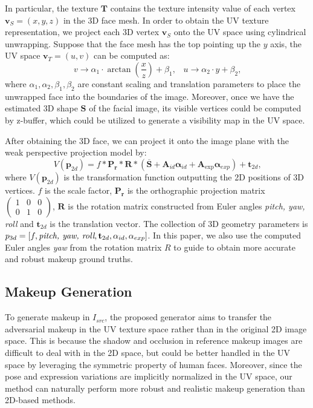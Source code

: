 \documentclass[10pt,journal,compsoc]{IEEEtran}
\begin{document}
In particular, the texture $\mathbf{T}$ contains the texture intensity value of each vertex $\mathbf{v}_S = (x, y, z)$ in the 3D face mesh. 
In order to obtain the UV texture representation, we project each 3D vertex $\mathbf{v}_S$ onto the UV space using cylindrical unwrapping. 
Suppose that the face mesh has the top pointing up the $y$ axis, the UV space $\mathbf{v}_T = (u, v)$ can be computed as:
\begin{equation}
	v \rightarrow \alpha_{1} \cdot \arctan \left(\frac{x}{z}\right)+\beta_{1}\text{,} \quad u \rightarrow \alpha_{2} \cdot y+\beta_{2} \text{,}
\end{equation}
where $\alpha_{1}, \alpha_{2}, \beta_{1}, \beta_{2}$ are constant scaling and translation parameters to place the unwrapped face into the boundaries of the image. 
Moreover, once we have the estimated 3D shape $\mathbf{S}$ of the facial image, its visible vertices could be computed by z-buffer, which could be utilized to generate a visibility map in the UV space. 

After obtaining the 3D face, we can project it onto the image plane with the weak perspective projection model by: 
\begin{equation}
	V\left(\mathbf{p}_{2d}\right)=f * \mathbf{P_{r}} * \mathbf{R} *\left(\overline{\mathbf{S}}+\mathbf{A}_{id} \boldsymbol{\alpha}_{i d}+\mathbf{A}_{\exp} \boldsymbol{\alpha}_{exp}\right)+\mathbf{t}_{2d} \text{,}
\end{equation}
where $V\left(\mathbf{p}_{2d}\right)$ is the transformation function outputting the 2D positions of 3D vertices. $f$ is the scale factor, $\mathbf{P_r}$ is the orthographic projection matrix $\left(\begin{array}{lll}1 & 0 & 0 \\ 0 & 1 & 0\end{array}\right)$, 
$\mathbf{R}$ is the rotation matrix constructed from Euler angles \emph{pitch, yaw, roll} and $\mathbf{t}_{2d}$ is the translation vector. 
The collection of 3D geometry parameters is $p_{3d}=[f, \emph{pitch, yaw, roll}, \mathbf{t}_{2d}, \alpha_{id}, \alpha_{exp}]$. 
In this paper, we also use the computed Euler angles \emph{yaw} from the rotation matrix $R$ to guide to obtain more accurate and robust makeup ground truths.

\subsection{Makeup Generation}
\label{subsection:texG}
To generate makeup in $I_{src}$, the proposed generator aims to transfer the adversarial makeup in the UV texture space rather than in the original 2D image space. 
%
This is because the shadow and occlusion in reference makeup images are difficult to deal with in the 2D space, but could be better handled in the UV space by leveraging the symmetric property of human faces. 
%
Moreover, since the pose and expression variations are implicitly normalized in the UV space, our method can naturally perform more robust and realistic makeup generation than 2D-based methods. 
\end{document}
